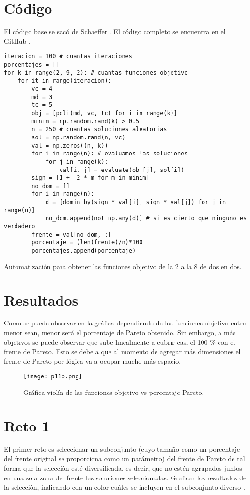 \documentclass{article}
\begin{document}
\newpage
\section{Código}
El código base se sacó de Schaeffer \cite{Elisa_Schaeffer}. El código completo se encuentra en el GitHub \cite{Denisse_Leyva}.

\renewcommand{\listingscaption}{Código}
\begin{listing}[H]
  \begin{verbatim}
iteracion = 100 # cuantas iteraciones
porcentajes = []
for k in range(2, 9, 2): # cuantas funciones objetivo
    for it in range(iteracion): 
        vc = 4
        md = 3
        tc = 5
        obj = [poli(md, vc, tc) for i in range(k)]
        minim = np.random.rand(k) > 0.5
        n = 250 # cuantas soluciones aleatorias
        sol = np.random.rand(n, vc)
        val = np.zeros((n, k))
        for i in range(n): # evaluamos las soluciones
            for j in range(k):
                val[i, j] = evaluate(obj[j], sol[i])
        sign = [1 + -2 * m for m in minim]
        no_dom = []
        for i in range(n):
            d = [domin_by(sign * val[i], sign * val[j]) for j in range(n)]
            no_dom.append(not np.any(d)) # si es cierto que ninguno es verdadero
        frente = val[no_dom, :]
        porcentaje = (len(frente)/n)*100
        porcentajes.append(porcentaje)
      \end{verbatim}
  \label{lst:fibo}
  \caption{Automatización para obtener las funciones objetivo de la 2 a la 8 de dos en dos.}
\end{listing}

\section{Resultados}
Como se puede observar en la gráfica dependiendo de las funciones objetivo entre menor sean, menor será el porcentaje de Pareto obtenido.
Sin embargo, a más objetivos se puede observar que sube linealmente a cubrir casi el 100 $\%$ con el frente de Pareto. Esto se debe a que al momento de agregar más dimensiones el frente de Pareto por lógica va a ocupar mucho más espacio.

\begin{figure}[H]
\centering
\texttt{[image: p11p.png]}
\caption{\label{fig3} Gráfica violín de las funciones objetivo vs porcentaje Pareto.}
\end{figure}

\section{Reto 1}
El primer reto es seleccionar un subconjunto (cuyo tamaño como un porcentaje del frente original se proporciona como un parámetro) del frente de Pareto de tal forma que la selección esté diversificada, es decir, que no estén agrupados juntos en una sola zona del frente las soluciones seleccionadas. Graficar los resultados de la selección, indicando con un color cuáles se incluyen en el subconjunto diverso \cite{Satu_Elisa_Schaeffer}.
\end{document}
